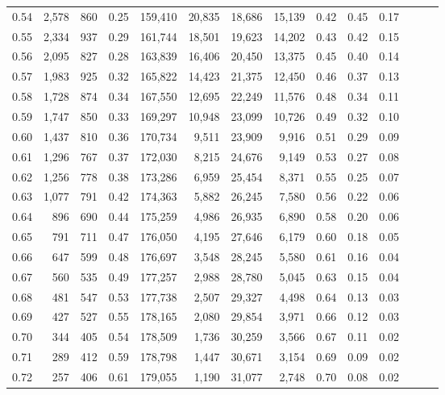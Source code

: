\begin{tabular}{rrrrrrrrrrrrrr}
0.54 &  2,578 &  860 &  0.25 &  159,410 &   20,835 &  18,686 &  15,139 &  0.42 &  0.45 &      0.17 \\
0.55 &  2,334 &  937 &  0.29 &  161,744 &   18,501 &  19,623 &  14,202 &  0.43 &  0.42 &      0.15 \\
0.56 &  2,095 &  827 &  0.28 &  163,839 &   16,406 &  20,450 &  13,375 &  0.45 &  0.40 &      0.14 \\
0.57 &  1,983 &  925 &  0.32 &  165,822 &   14,423 &  21,375 &  12,450 &  0.46 &  0.37 &      0.13 \\
0.58 &  1,728 &  874 &  0.34 &  167,550 &   12,695 &  22,249 &  11,576 &  0.48 &  0.34 &      0.11 \\
0.59 &  1,747 &  850 &  0.33 &  169,297 &   10,948 &  23,099 &  10,726 &  0.49 &  0.32 &      0.10 \\
0.60 &  1,437 &  810 &  0.36 &  170,734 &    9,511 &  23,909 &   9,916 &  0.51 &  0.29 &      0.09 \\
0.61 &  1,296 &  767 &  0.37 &  172,030 &    8,215 &  24,676 &   9,149 &  0.53 &  0.27 &      0.08 \\
0.62 &  1,256 &  778 &  0.38 &  173,286 &    6,959 &  25,454 &   8,371 &  0.55 &  0.25 &      0.07 \\
0.63 &  1,077 &  791 &  0.42 &  174,363 &    5,882 &  26,245 &   7,580 &  0.56 &  0.22 &      0.06 \\
0.64 &    896 &  690 &  0.44 &  175,259 &    4,986 &  26,935 &   6,890 &  0.58 &  0.20 &      0.06 \\
0.65 &    791 &  711 &  0.47 &  176,050 &    4,195 &  27,646 &   6,179 &  0.60 &  0.18 &      0.05 \\
0.66 &    647 &  599 &  0.48 &  176,697 &    3,548 &  28,245 &   5,580 &  0.61 &  0.16 &      0.04 \\
0.67 &    560 &  535 &  0.49 &  177,257 &    2,988 &  28,780 &   5,045 &  0.63 &  0.15 &      0.04 \\
0.68 &    481 &  547 &  0.53 &  177,738 &    2,507 &  29,327 &   4,498 &  0.64 &  0.13 &      0.03 \\
0.69 &    427 &  527 &  0.55 &  178,165 &    2,080 &  29,854 &   3,971 &  0.66 &  0.12 &      0.03 \\
0.70 &    344 &  405 &  0.54 &  178,509 &    1,736 &  30,259 &   3,566 &  0.67 &  0.11 &      0.02 \\
0.71 &    289 &  412 &  0.59 &  178,798 &    1,447 &  30,671 &   3,154 &  0.69 &  0.09 &      0.02 \\
0.72 &    257 &  406 &  0.61 &  179,055 &    1,190 &  31,077 &   2,748 &  0.70 &  0.08 &      0.02 \\

\end{tabular}
